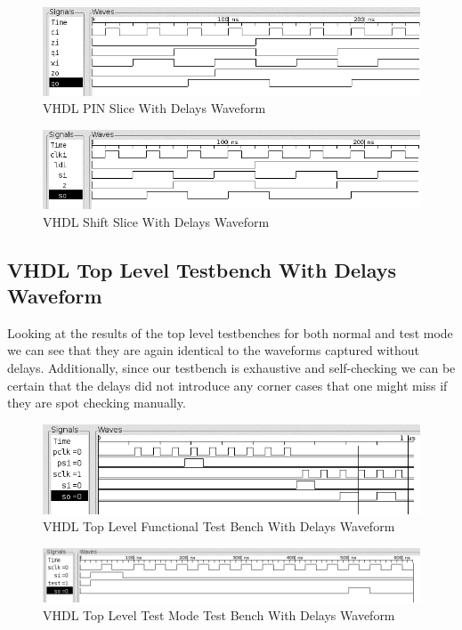         \begin{figure}[H]
            \centering
            \includegraphics[width=0.8\linewidth]{../../doc/vhdl_sim_pics/pin_slice_with_delays.png}
            \caption{VHDL PIN Slice With Delays Waveform}
        \end{figure}

        \begin{figure}[H]
            \centering
            \includegraphics[width=0.8\linewidth]{../../doc/vhdl_sim_pics/shift_slice_with_delays.png}
            \caption{VHDL Shift Slice With Delays Waveform}
        \end{figure}

    \subsection{VHDL Top Level Testbench With Delays Waveform}

        Looking at the results of the top level testbenches for both normal and
        test mode we can see that they are again identical to the waveforms
        captured without delays.  Additionally, since our testbench is
        exhaustive and self-checking we can be certain that the delays did not
        introduce any corner cases that one might miss if they are spot checking
        manually.
        \begin{figure}[H]
            \centering
            \includegraphics[width=0.8\linewidth]{../../doc/vhdl_sim_pics/top.png}
            \caption{VHDL Top Level Functional Test Bench With Delays Waveform}
        \end{figure}

        \begin{figure}[H]
            \centering
            \includegraphics[width=0.8\linewidth]{../../doc/vhdl_sim_pics/top_test.png}
            \caption{VHDL Top Level Test Mode Test Bench With Delays Waveform}
        \end{figure}

